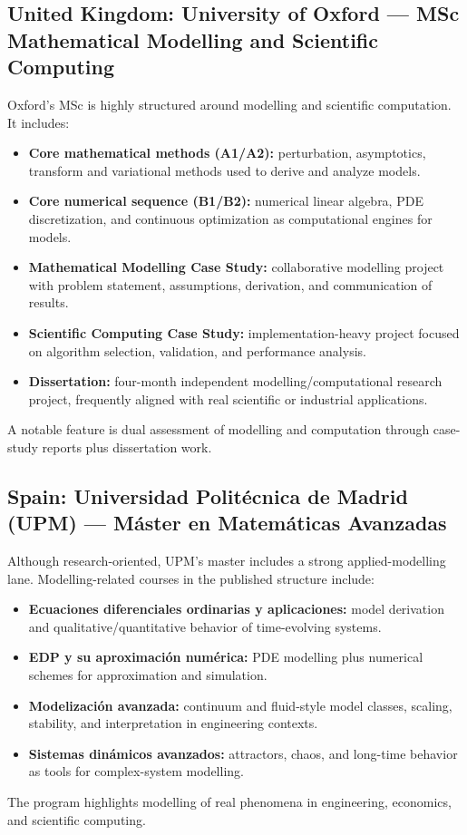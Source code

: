 ﻿\documentclass[11pt,a4paper]{article}
\begin{document}
\subsection*{United Kingdom: University of Oxford --- MSc Mathematical Modelling and Scientific Computing}
Oxford's MSc is highly structured around modelling and scientific computation. It includes:
\begin{itemize}[leftmargin=*]
  \item \textbf{Core mathematical methods (A1/A2):} perturbation, asymptotics, transform and variational methods used to derive and analyze models.
  \item \textbf{Core numerical sequence (B1/B2):} numerical linear algebra, PDE discretization, and continuous optimization as computational engines for models.
  \item \textbf{Mathematical Modelling Case Study:} collaborative modelling project with problem statement, assumptions, derivation, and communication of results.
  \item \textbf{Scientific Computing Case Study:} implementation-heavy project focused on algorithm selection, validation, and performance analysis.
  \item \textbf{Dissertation:} four-month independent modelling/computational research project, frequently aligned with real scientific or industrial applications.
\end{itemize}
A notable feature is dual assessment of modelling and computation through case-study reports plus dissertation work.

\subsection*{Spain: Universidad Polit\'ecnica de Madrid (UPM) --- M\'aster en Matem\'aticas Avanzadas}
Although research-oriented, UPM's master includes a strong applied-modelling lane. Modelling-related courses in the published structure include:
\begin{itemize}[leftmargin=*]
  \item \textbf{Ecuaciones diferenciales ordinarias y aplicaciones:} model derivation and qualitative/quantitative behavior of time-evolving systems.
  \item \textbf{EDP y su aproximaci\'on num\'erica:} PDE modelling plus numerical schemes for approximation and simulation.
  \item \textbf{Modelizaci\'on avanzada:} continuum and fluid-style model classes, scaling, stability, and interpretation in engineering contexts.
  \item \textbf{Sistemas din\'amicos avanzados:} attractors, chaos, and long-time behavior as tools for complex-system modelling.
\end{itemize}
The program highlights modelling of real phenomena in engineering, economics, and scientific computing.
\end{document}
